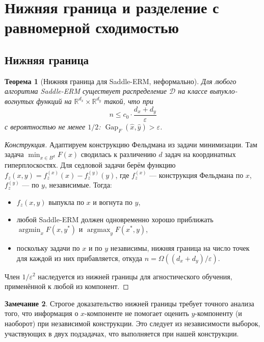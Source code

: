 \documentclass[12pt,a4paper]{article}
\theoremstyle{plain}
\newtheorem{theorem}{Теорема}[section]
\theoremstyle{definition}
\newtheorem{remark}[theorem]{Замечание}
\DeclareMathOperator{\Gap}{Gap}
\DeclareMathOperator*{\argmin}{argmin}
\DeclareMathOperator*{\argmax}{argmax}
\newcommand{\R}{\mathbb{R}}
\newcommand{\cD}{\mathcal{D}}
\begin{document}
\section{Нижняя граница и разделение с равномерной сходимостью}

\subsection{Нижняя граница}

\begin{theorem}[Нижняя граница для Saddle-ERM, неформально]
\label{thm:lower}
Для любого алгоритма Saddle-ERM существует распределение $\cD$ на классе выпукло-вогнутых функций на $\R^{d_x}\times\R^{d_y}$ такой, что при
\[
    n\le c_0\cdot\frac{d_x+d_y}{\varepsilon}
\]
с вероятностью не менее $1/2$: $\Gap_F(\hat{x},\hat{y})>\varepsilon$.
\end{theorem}

\begin{proof}[Конструкция]
Адаптируем конструкцию Фельдмана \cite{Feldman2016} из задачи минимизации. Там задача $\min_{x\in B^d} F(x)$ сводилась к различению $d$ задач на координатных гиперплоскостях. Для седловой задачи берём функцию $f_z(x,y)=f_z^{(x)}(x)-f_z^{(y)}(y)$, где $f_z^{(x)}$ --- конструкция Фельдмана по $x$, $f_z^{(y)}$ --- по $y$, независимые. Тогда:
\begin{itemize}
    \item $f_z(x,y)$ выпукла по $x$ и вогнута по $y$,
    \item любой Saddle-ERM должен одновременно хорошо приближать $\argmin_x F(x,y^*)$ и $\argmax_y F(x^*,y)$,
    \item поскольку задачи по $x$ и по $y$ независимы, нижняя граница на число точек для каждой из них прибавляется, откуда $n=\Omega((d_x+d_y)/\varepsilon)$.
\end{itemize}
Член $1/\varepsilon^2$ наследуется из нижней границы для агностического обучения, применённой к любой из компонент.
\end{proof}

\begin{remark}
Строгое доказательство нижней границы требует точного анализа того, что информация о $x$-компоненте не помогает оценить $y$-компоненту (и наоборот) при независимой конструкции. Это следует из независимости выборок, участвующих в двух подзадачах, что выполняется при нашей конструкции.
\end{remark}
\end{document}
